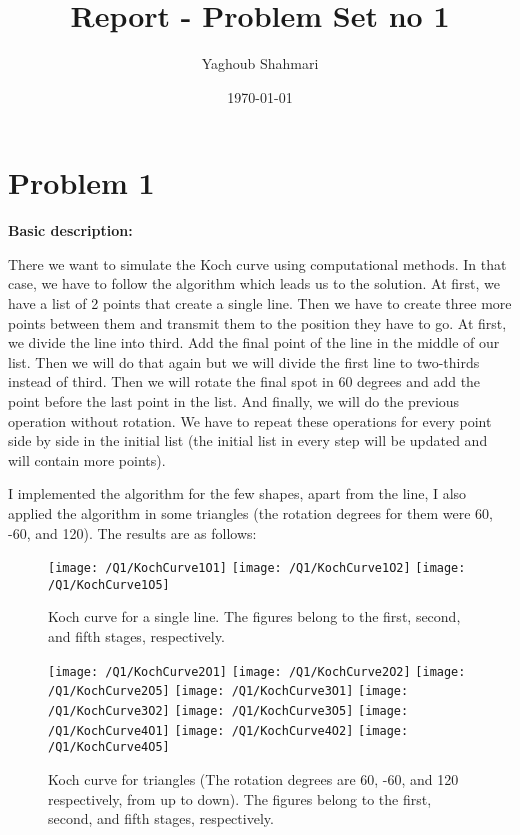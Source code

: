\documentclass{article}
\author{Yaghoub Shahmari}
\title{Report - Problem Set no 1}
\date{\today}
\begin{document}
    \maketitle
    \section*{Problem 1}
    \textbf{Basic description:}

    There we want to simulate the Koch curve using computational methods.
    In that case, we have to follow the algorithm which leads us to the solution.
    At first, we have a list of 2 points that create a single line.
    Then we have to create three more points between them and transmit them to the position they have to go.
    At first, we divide the line into third.
    Add the final point of the line in the middle of our list.
    Then we will do that again but we will divide the first line to two-thirds instead of third.
    Then we will rotate the final spot in 60 degrees and add the point before the last point in the list.
    And finally, we will do the previous operation without rotation.
    We have to repeat these operations for every point side by side in the initial list (the initial list in every step will be updated and will contain more points).

    I implemented the algorithm for the few shapes, apart from the line,
    I also applied the algorithm in some triangles
    (the rotation degrees for them were 60, -60, and 120).
    The results are as follows:

    \begin{figure}[!htb]
        \centering
        \texttt{[image: /Q1/KochCurve1O1]}
        \label{fig:1.1.1}
        \texttt{[image: /Q1/KochCurve1O2]}
        \label{fig:1.1.2}
        \texttt{[image: /Q1/KochCurve1O5]}
        \label{fig:1.1.3}
        \caption{Koch curve for a single line. The figures belong to the first, second, and fifth stages, respectively.}
    \end{figure}
    \begin{figure}[!htb]
        \centering
        \texttt{[image: /Q1/KochCurve2O1]}
        \label{fig:1.2.1}
        \texttt{[image: /Q1/KochCurve2O2]}
        \label{fig:1.2.2}
        \texttt{[image: /Q1/KochCurve2O5]}
        \label{fig:1.2.3}
        \texttt{[image: /Q1/KochCurve3O1]}
        \label{fig:1.3.1}
        \texttt{[image: /Q1/KochCurve3O2]}
        \label{fig:1.3.2}
        \texttt{[image: /Q1/KochCurve3O5]}
        \label{fig:1.3.3}
        \texttt{[image: /Q1/KochCurve4O1]}
        \label{fig:1.4.1}
        \texttt{[image: /Q1/KochCurve4O2]}
        \label{fig:1.4.2}
        \texttt{[image: /Q1/KochCurve4O5]}
        \label{fig:1.4.3}
        \caption{Koch curve for triangles (The rotation degrees are 60, -60, and 120 respectively, from up to down). The figures belong to the first, second, and fifth stages, respectively.}
    \end{figure}
\end{document}
